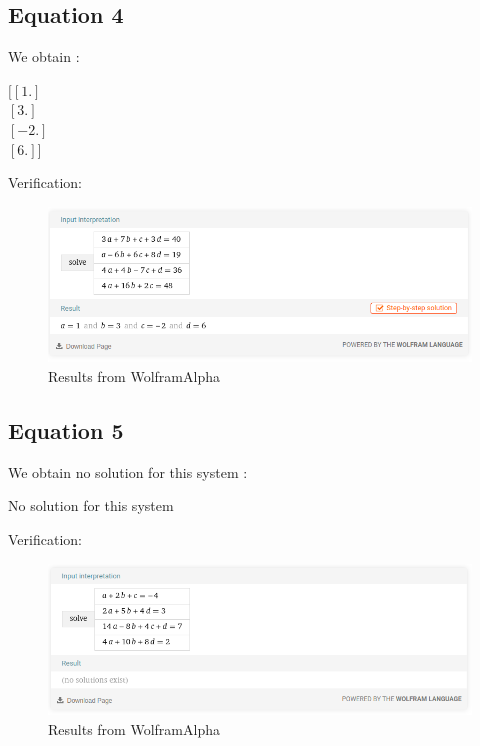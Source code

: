 \subsection{Equation 4}

We obtain : \\
\begin{resultbox}
$[[ 1.]$\\
$ [ 3.]$\\
$ [-2.]$\\
$ [ 6.]]$
\end{resultbox}
Verification:
\begin{figure}[H]
  \centering
  \includegraphics[width=14cm]{images/lineq4.png}
  \caption{Results from WolframAlpha}
  \label{fig:lineq4}
\end{figure}

\subsection{Equation 5}

We obtain no solution for this system : \\
\begin{resultbox}
    No solution for this system
\end{resultbox}
Verification:
\begin{figure}[H]
  \centering
  \includegraphics[width=14cm]{images/lineq5.png}
  \caption{Results from WolframAlpha}
  \label{fig:lineq5}
\end{figure}